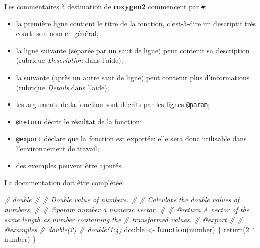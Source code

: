 \documentclass[
  11pt,
  french,
  a4paper,
  extrafontsizes,onecolumn,openright
  ]{memoir}
\newenvironment{Shaded}{\begin{snugshade}}{\end{snugshade}}
\newcommand{\CommentTok}[1]{\textcolor[rgb]{0.56,0.35,0.01}{\textit{#1}}}
\newcommand{\ControlFlowTok}[1]{\textcolor[rgb]{0.13,0.29,0.53}{\textbf{#1}}}
\newcommand{\DecValTok}[1]{\textcolor[rgb]{0.00,0.00,0.81}{#1}}
\newcommand{\FunctionTok}[1]{\textcolor[rgb]{0.00,0.00,0.00}{#1}}
\newcommand{\NormalTok}[1]{#1}
\newcommand{\OtherTok}[1]{\textcolor[rgb]{0.56,0.35,0.01}{#1}}
\newcommand{\SpecialCharTok}[1]{\textcolor[rgb]{0.00,0.00,0.00}{#1}}
\providecommand{\tightlist}{%
  \setlength{\itemsep}{0pt}\setlength{\parskip}{0pt}}
\begin{document}
\normalsize

Les commentaires à destination de \textbf{roxygen2} commencent par \texttt{\#\textquotesingle{}}:

\begin{itemize}
\tightlist
\item
  la première ligne contient le titre de la fonction, c'est-à-dire un descriptif très court: son nom en général;
\item
  la ligne suivante (séparée par un saut de ligne) peut contenir sa description (rubrique \emph{Description} dans l'aide);
\item
  la suivante (après un autre saut de ligne) peut contenir plus d'informations (rubrique \emph{Details} dans l'aide);
\item
  les arguments de la fonction sont décrits par les lignes \texttt{@param};
\item
  \texttt{@return} décrit le résultat de la fonction;
\item
  \texttt{@export} déclare que la fonction est exportée: elle sera donc utilisable dans l'environnement de travail;
\item
  des exemples peuvent être ajoutés.
\end{itemize}

La documentation doit être complétée:

\scriptsize

\begin{Shaded}
\begin{Highlighting}[]
\CommentTok{\#\textquotesingle{} double}
\CommentTok{\#\textquotesingle{} }
\CommentTok{\#\textquotesingle{} Double value of numbers.}
\CommentTok{\#\textquotesingle{}}
\CommentTok{\#\textquotesingle{} Calculate the double values of numbers.}
\CommentTok{\#\textquotesingle{} }
\CommentTok{\#\textquotesingle{} @param number a numeric vector.}
\CommentTok{\#\textquotesingle{}}
\CommentTok{\#\textquotesingle{} @return A vector of the same length as \textasciigrave{}number\textasciigrave{} containing the }
\CommentTok{\#\textquotesingle{}   transformed values.}
\CommentTok{\#\textquotesingle{} @export}
\CommentTok{\#\textquotesingle{}}
\CommentTok{\#\textquotesingle{} @examples}
\CommentTok{\#\textquotesingle{} double(2)}
\CommentTok{\#\textquotesingle{} double(1:4)}
\NormalTok{double }\OtherTok{\textless{}{-}} \ControlFlowTok{function}\NormalTok{(number) \{}
    \FunctionTok{return}\NormalTok{(}\DecValTok{2} \SpecialCharTok{*}\NormalTok{ number)}
\NormalTok{\}}
\end{Highlighting}
\end{Shaded}
\end{document}
